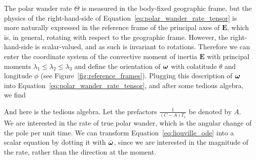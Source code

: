 \documentclass[extra,mreferee]{gji}
\newif\ifdetail
\begin{document}
The polar wander rate $\dot{\Theta}$ is measured in the body-fixed geographic frame, 
but the physics of the right-hand-side of Equation~\eqref{eq:polar_wander_rate_tensor} 
is more naturally expressed in the reference frame of the principal axes of $\mathbf{E}$,
which is, in general, rotating with respect to the geographic frame.
However, the right-hand-side is scalar-valued, and as such is invariant to rotations.
Therefore we can enter the coordinate system of the convective moment of inertia $\mathbf{E}$ 
with principal moments $\lambda_1 \le \lambda_2 \le \lambda_3$ and define the orientation of 
$\mitbf{\omega}$ with colatitude $\theta$ and longitude $\phi$ (see Figure~\ref{fig:reference_frames}).
Plugging this description of $\mitbf{\omega}$ into Equation~\eqref{eq:polar_wander_rate_tensor},
and after some tedious algebra, we find
\ifdetail

And here is the tedious algebra.  Let the prefactors $\frac{1}{(C-A)T_1}$ be denoted by $A$.
We are interested in the rate of true polar wander, which is the angular change of the pole
per unit time. We can transform Equation~\eqref{eq:liouville_ode} into a scalar equation by dotting it
with $\dot{\mitbf{\omega}}$, since we are interested in the magnitude of the rate, rather than
the direction at the moment.
\end{document}
